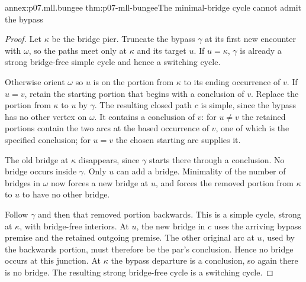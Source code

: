 \begin{annexitem}{annex:p07.mll.bungee}
 {thm:p07-mll-bungee}{The minimal-bridge cycle cannot admit the bypass}
\begin{proof}
Let \(\kappa\) be the bridge pier. Truncate the bypass \(\gamma\) at
its first new encounter with \(\omega\), so the paths meet only at
\(\kappa\) and its target \(u\). If \(u=\kappa\), \(\gamma\) is
already a strong bridge-free simple cycle and hence a switching cycle.

Otherwise orient \(\omega\) so \(u\) is on the portion from \(\kappa\)
to its ending occurrence of \(v\). If \(u=v\), retain the starting
portion that begins with a conclusion of \(v\). Replace the portion
from \(\kappa\) to \(u\) by \(\gamma\). The resulting closed path
\(c\) is simple, since the bypass has no other vertex on \(\omega\).
It contains a conclusion of \(v\): for \(u\ne v\) the retained portions
contain the two arcs at the based occurrence of \(v\), one of which is
the specified conclusion; for \(u=v\) the chosen starting arc supplies it.

The old bridge at \(\kappa\) disappears, since \(\gamma\) starts there
through a conclusion. No bridge occurs inside \(\gamma\).
Only \(u\) can add a bridge. Minimality of the number of bridges in
\(\omega\) now forces a new bridge at \(u\), and forces the removed
portion from \(\kappa\) to \(u\) to have no other bridge.

Follow \(\gamma\) and then that removed portion backwards.
This is a simple cycle, strong at \(\kappa\), with bridge-free interiors.
At \(u\), the new bridge in \(c\) uses the arriving bypass premise and
the retained outgoing premise. The other original arc at \(u\), used
by the backwards portion, must therefore be the par's conclusion.
Hence no bridge occurs at this junction. At \(\kappa\) the bypass
departure is a conclusion, so again there is no bridge.
The resulting strong bridge-free cycle is a switching cycle.
\end{proof}
\end{annexitem}

